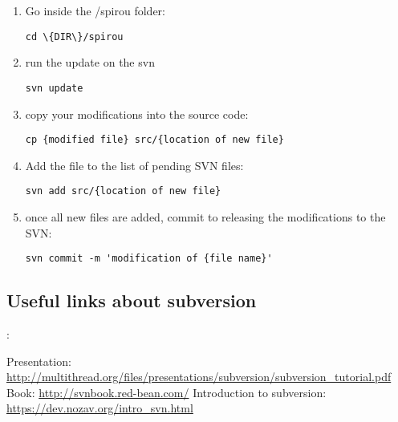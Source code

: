 \begin{enumerate}
\item Go inside the /spirou folder:
\begin{lstlisting}[style=bashstyle]
cd \{DIR\}/spirou
\end{lstlisting}

\item run the update on the svn
\begin{lstlisting}[style=bashstyle]
svn update
\end{lstlisting}

\item copy your modifications into the source code:
\begin{lstlisting}[style=bashstyle]
cp {modified file} src/{location of new file}
\end{lstlisting}

\item Add the file to the list of pending SVN files:
\begin{lstlisting}[style=bashstyle]
svn add src/{location of new file}
\end{lstlisting}

\item once all new files are added, commit to releasing the modifications to the SVN:
\begin{lstlisting}[style=bashstyle]
svn commit -m 'modification of {file name}'
\end{lstlisting}

\end{enumerate}

\subsection{Useful links about subversion}:
\label{section:useful-links}

Presentation: \url{http://multithread.org/files/presentations/subversion/subversion_tutorial.pdf}
Book: \url{http://svnbook.red-bean.com/}
Introduction to subversion: \url{https://dev.nozav.org/intro_svn.html}
